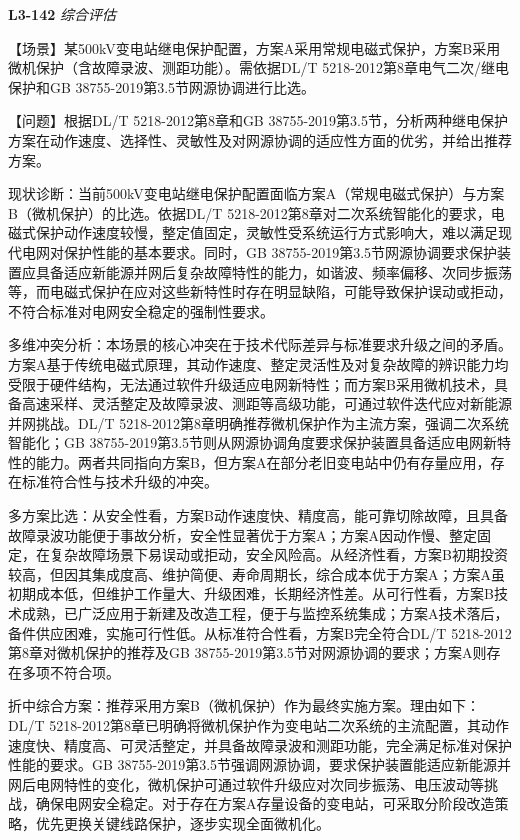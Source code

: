 \documentclass[12pt,a4paper]{ctexart}
\begin{document}
\noindent\textbf{L3-142} \hfill \textit{综合评估}
\begin{description}[leftmargin=1.5em,style=nextline,font=\normalfont]
  \item[Q:] 【场景】某500kV变电站继电保护配置，方案A采用常规电磁式保护，方案B采用微机保护（含故障录波、测距功能）。需依据DL/T 5218-2012第8章电气二次/继电保护和GB 38755-2019第3.5节网源协调进行比选。

【问题】根据DL/T 5218-2012第8章和GB 38755-2019第3.5节，分析两种继电保护方案在动作速度、选择性、灵敏性及对网源协调的适应性方面的优劣，并给出推荐方案。
  \item[A:] 现状诊断：当前500kV变电站继电保护配置面临方案A（常规电磁式保护）与方案B（微机保护）的比选。依据DL/T 5218-2012第8章对二次系统智能化的要求，电磁式保护动作速度较慢，整定值固定，灵敏性受系统运行方式影响大，难以满足现代电网对保护性能的基本要求。同时，GB 38755-2019第3.5节网源协调要求保护装置应具备适应新能源并网后复杂故障特性的能力，如谐波、频率偏移、次同步振荡等，而电磁式保护在应对这些新特性时存在明显缺陷，可能导致保护误动或拒动，不符合标准对电网安全稳定的强制性要求。

多维冲突分析：本场景的核心冲突在于技术代际差异与标准要求升级之间的矛盾。方案A基于传统电磁式原理，其动作速度、整定灵活性及对复杂故障的辨识能力均受限于硬件结构，无法通过软件升级适应电网新特性；而方案B采用微机技术，具备高速采样、灵活整定及故障录波、测距等高级功能，可通过软件迭代应对新能源并网挑战。DL/T 5218-2012第8章明确推荐微机保护作为主流方案，强调二次系统智能化；GB 38755-2019第3.5节则从网源协调角度要求保护装置具备适应电网新特性的能力。两者共同指向方案B，但方案A在部分老旧变电站中仍有存量应用，存在标准符合性与技术升级的冲突。

多方案比选：从安全性看，方案B动作速度快、精度高，能可靠切除故障，且具备故障录波功能便于事故分析，安全性显著优于方案A；方案A因动作慢、整定固定，在复杂故障场景下易误动或拒动，安全风险高。从经济性看，方案B初期投资较高，但因其集成度高、维护简便、寿命周期长，综合成本优于方案A；方案A虽初期成本低，但维护工作量大、升级困难，长期经济性差。从可行性看，方案B技术成熟，已广泛应用于新建及改造工程，便于与监控系统集成；方案A技术落后，备件供应困难，实施可行性低。从标准符合性看，方案B完全符合DL/T 5218-2012第8章对微机保护的推荐及GB 38755-2019第3.5节对网源协调的要求；方案A则存在多项不符合项。

折中综合方案：推荐采用方案B（微机保护）作为最终实施方案。理由如下：DL/T 5218-2012第8章已明确将微机保护作为变电站二次系统的主流配置，其动作速度快、精度高、可灵活整定，并具备故障录波和测距功能，完全满足标准对保护性能的要求。GB 38755-2019第3.5节强调网源协调，要求保护装置能适应新能源并网后电网特性的变化，微机保护可通过软件升级应对次同步振荡、电压波动等挑战，确保电网安全稳定。对于存在方案A存量设备的变电站，可采取分阶段改造策略，优先更换关键线路保护，逐步实现全面微机化。


\end{description}
\end{document}
